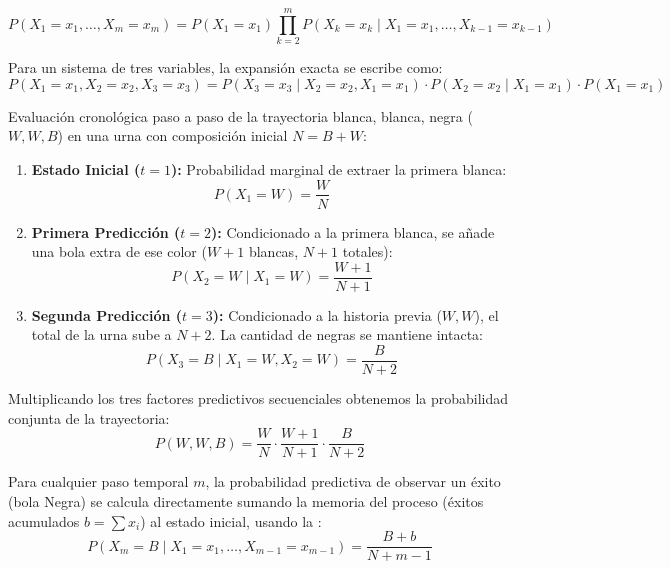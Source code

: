 \begin{equation*}
    P(X_1 = x_1, \dots, X_m = x_m) = P(X_1 = x_1) \prod_{k=2}^{m} P(X_k = x_k \mid X_1 = x_1, \dots, X_{k-1} = x_{k-1})
\end{equation*}

Para un sistema de tres variables, la expansión exacta se escribe como:
\begin{equation*}
    P(X_1 = x_1, X_2 = x_2, X_3 = x_3) = P(X_3 = x_3 \mid X_2 = x_2, X_1 = x_1) \cdot P(X_2 = x_2 \mid X_1 = x_1) \cdot P(X_1 = x_1)
\end{equation*}


\begin{ejemplo}
    Evaluación cronológica paso a paso de la trayectoria blanca, blanca, negra ($W, W, B$) en una urna con composición inicial $N = B + W$:

    \begin{enumerate}
        \item \textbf{Estado Inicial ($t=1$):} Probabilidad marginal de extraer la primera blanca:
        \begin{equation}
            P(X_1 = W) = \frac{W}{N}
        \end{equation}
        \item \textbf{Primera Predicción ($t=2$):} Condicionado a la primera blanca, se añade una bola extra de ese color ($W+1$ blancas, $N+1$ totales):
        \begin{equation}
            P(X_2 = W \mid X_1 = W) = \frac{W+1}{N+1}
        \end{equation}
        \item \textbf{Segunda Predicción ($t=3$):} Condicionado a la historia previa ($W,W$), el total de la urna sube a $N+2$. La cantidad de negras se mantiene intacta:
        \begin{equation}
            P(X_3 = B \mid X_1 = W, X_2 = W) = \frac{B}{N+2}
        \end{equation}
    \end{enumerate}

    Multiplicando los tres factores predictivos secuenciales obtenemos la probabilidad conjunta de la trayectoria:
    \begin{equation*}
        P(W, W, B) = \frac{W}{N} \cdot \frac{W+1}{N+1} \cdot \frac{B}{N+2}
    \end{equation*}
    \begin{definicion}
        Para cualquier paso temporal $m$, la probabilidad predictiva de observar un éxito (bola Negra) se calcula directamente sumando la memoria del proceso (éxitos acumulados $b = \sum x_i$) al estado inicial, usando la :
        \begin{equation*}
            P(X_m = B \mid X_1 = x_1, \dots, X_{m-1} = x_{m-1}) = \frac{B + b}{N + m - 1}
        \end{equation*}
    \end{definicion}
\end{ejemplo}

